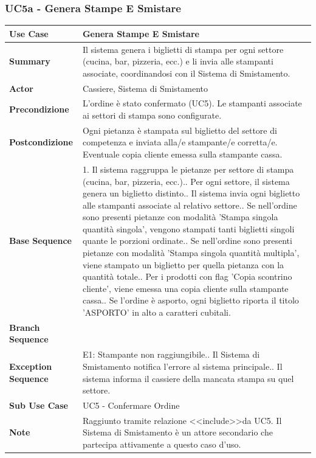 \newpage 

\subsubsection*{UC5a - Genera Stampe E Smistare}
\begin{center}
\begin{tabular}{|p{}|p{}|}
\hline
\textbf{Use Case} & Genera Stampe E Smistare \\ \hline
\textbf{Summary} & Il sistema genera i biglietti di stampa per ogni settore (cucina, bar, pizzeria, ecc.) e li invia alle stampanti associate, coordinandosi con il Sistema di Smistamento. \\ \hline
\textbf{Actor} & Cassiere, Sistema di Smistamento \\ \hline
\textbf{Precondizione} & L'ordine è stato confermato (UC5). Le stampanti associate ai settori di stampa sono configurate. \\ \hline
\textbf{Postcondizione} & Ogni pietanza è stampata sul biglietto del settore di competenza e inviata alla/e stampante/e corretta/e. Eventuale copia cliente emessa sulla stampante cassa. \\ \hline
\textbf{Base Sequence} & 1. Il sistema raggruppa le pietanze per settore di stampa (cucina, bar, pizzeria, ecc.).\newline 2. Per ogni settore, il sistema genera un biglietto distinto.\newline 3. Il sistema invia ogni biglietto alle stampanti associate al relativo settore.\newline 4. Se nell'ordine sono presenti pietanze con modalità 'Stampa singola quantità singola', vengono stampati tanti biglietti singoli quante le porzioni ordinate.\newline 5. Se nell'ordine sono presenti pietanze con modalità 'Stampa singola quantità multipla', viene stampato un biglietto per quella pietanza con la quantità totale.\newline 6. Per i prodotti con flag 'Copia scontrino cliente', viene emessa una copia cliente sulla stampante cassa.\newline 7. Se l'ordine è asporto, ogni biglietto riporta il titolo 'ASPORTO' in alto a caratteri cubitali. \\ \hline
\textbf{Branch Sequence} & \\ \hline
\textbf{Exception Sequence} & E1: Stampante non raggiungibile.\newline 3. Il Sistema di Smistamento notifica l'errore al sistema principale.\newline 4. Il sistema informa il cassiere della mancata stampa su quel settore. \\ \hline
\textbf{Sub Use Case} & UC5 - Confermare Ordine \\ \hline
\textbf{Note} & Raggiunto tramite relazione \textless\textless include\textgreater\textgreater da UC5. Il Sistema di Smistamento è un attore secondario che partecipa attivamente a questo caso d'uso. \\ \hline
\end{tabular}
\end{center}

